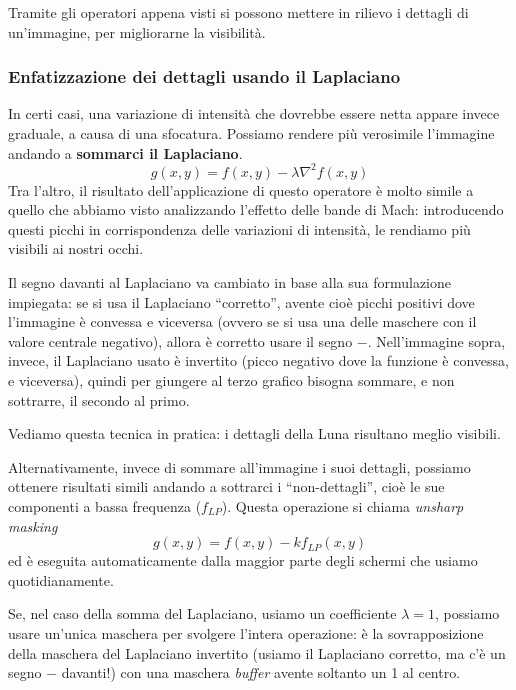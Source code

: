 \documentclass[a4paper,11pt]{article}
\begin{document}
\par
Tramite gli operatori appena visti si possono mettere in rilievo i dettagli di un'immagine, per migliorarne la visibilità.

\subsubsection{Enfatizzazione dei dettagli usando il Laplaciano}

In certi casi, una variazione di intensità che dovrebbe essere netta appare invece graduale, a causa di una sfocatura. Possiamo rendere più
verosimile l'immagine andando a \textbf{sommarci il Laplaciano}.
\[g(x,y) = f(x,y) - \lambda \nabla^2 f(x,y) \]
Tra l'altro, il risultato dell'applicazione di questo operatore è molto simile a quello che abbiamo visto analizzando l'effetto delle bande di Mach:
introducendo questi picchi in corrispondenza delle variazioni di intensità, le rendiamo più visibili ai nostri occhi.
\par
Il segno davanti al Laplaciano va cambiato in base alla sua formulazione impiegata: se si usa il Laplaciano ``corretto'',
avente cioè picchi positivi dove l'immagine è convessa e viceversa (ovvero se si usa una delle maschere con il valore centrale negativo),
allora è corretto usare il segno $-$. Nell'immagine sopra, invece, il Laplaciano usato
è invertito (picco negativo dove la funzione è convessa, e viceversa), quindi per giungere al terzo grafico bisogna sommare, e non sottrarre, il secondo al primo.
\par
Vediamo questa tecnica in pratica: i dettagli della Luna risultano meglio visibili.
\par
Alternativamente, invece di sommare all'immagine i suoi dettagli, possiamo ottenere risultati simili andando a sottrarci i ``non-dettagli'',
cioè le sue componenti a bassa frequenza ($f_{LP}$). Questa operazione si chiama \textit{unsharp masking}
\[ g(x,y) = f(x,y) - k f_{LP}(x,y) \]
ed è eseguita automaticamente dalla maggior parte degli schermi che usiamo quotidianamente.
\par
Se, nel caso della somma del Laplaciano, usiamo un coefficiente $\lambda = 1$, possiamo usare un'unica maschera per svolgere l'intera
operazione: è la sovrapposizione della maschera del Laplaciano invertito (usiamo il Laplaciano corretto, ma c'è un segno $-$ davanti!) con una
maschera \textit{buffer} avente soltanto un 1 al centro.
\end{document}
